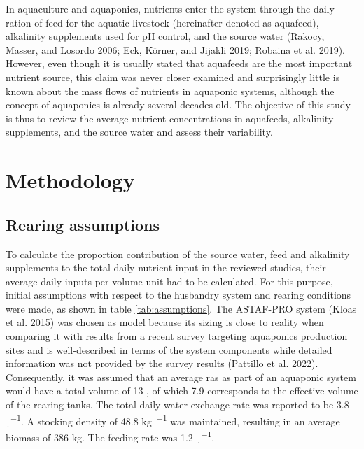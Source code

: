 \documentclass[preprint, 3p,
authoryear]{elsarticle} %
\begin{document}
In aquaculture and aquaponics, nutrients enter the system through the
daily ration of feed for the aquatic livestock (hereinafter denoted as
aquafeed), alkalinity supplements used for pH control, and the source
water (Rakocy, Masser, and Losordo 2006; Eck, Körner, and Jijakli 2019;
Robaina et al. 2019). However, even though it is usually stated that
aquafeeds are the most important nutrient source, this claim was never
closer examined and surprisingly little is known about the mass flows of
nutrients in aquaponic systems, although the concept of aquaponics is
already several decades old. The objective of this study is thus to
review the average nutrient concentrations in aquafeeds, alkalinity
supplements, and the source water and assess their variability.

\hypertarget{methodology}{%
\section{Methodology}\label{methodology}}

\hypertarget{rearing-assumptions}{%
\subsection{Rearing assumptions}\label{rearing-assumptions}}

To calculate the proportion contribution of the source water, feed and
alkalinity supplements to the total daily nutrient input in the reviewed
studies, their average daily inputs per volume unit had to be
calculated. For this purpose, initial assumptions with respect to the
husbandry system and rearing conditions were made, as shown in table
\ref{tab:assumptions}. The ASTAF-PRO system (Kloas et al. 2015) was
chosen as model because its sizing is close to reality when comparing it
with results from a recent survey targeting aquaponics production sites
and is well-described in terms of the system components while detailed
information was not provided by the survey results (Pattillo et al.
2022). Consequently, it was assumed that an average \gls{ras} as part of
an aquaponic system would have a total volume of 13 \si{\cubicm}, of
which 7.9 \si{\cubicm} corresponds to the effective volume of the
rearing tanks. The total daily water exchange rate was reported to be
3.8 \si{\p\per\d}. A stocking density of 48.8 \si{\kg\per\cubicm} was
maintained, resulting in an average biomass of 386 \si{\kg}. The feeding
rate was 1.2 \si{\p\per\d}.


\end{document}
